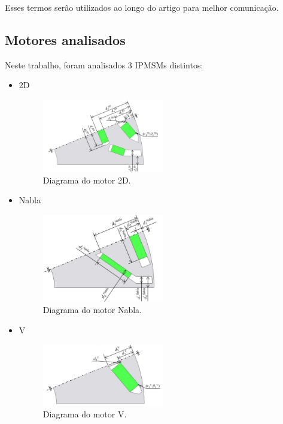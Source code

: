 \documentclass{article}
\begin{document}
\noindent Esses termos serão utilizados ao longo do artigo para melhor comunicação.


\newpage


\subsection{Motores analisados}

\noindent Neste trabalho, foram analisados 3 IPMSMs distintos:

\begin{itemize}
    \item 2D
    \\
        \begin{figure}[htbp]
            \centering
            \includegraphics[width=0.5\textwidth]{images/diagram_2d.png}
            \caption{Diagrama do motor 2D. \cite{shimizu2022efficiency}}
            \label{fig:diagram_2d}
        \end{figure}
    \item Nabla
    \\
        \begin{figure}[htbp]
            \centering
            \includegraphics[width=0.5\textwidth]{images/diagram_nabla.png}
            \caption{Diagrama do motor Nabla. \cite{shimizu2022efficiency}}
            \label{fig:diagram_nabla}
        \end{figure}
    \item V
    \\
        \begin{figure}[htbp]
            \centering
            \includegraphics[width=0.5\textwidth]{images/diagram_v.png}
            \caption{Diagrama do motor V. \cite{shimizu2022efficiency}}
            \label{fig:diagram_v}
        \end{figure}
\end{itemize}
\end{document}
